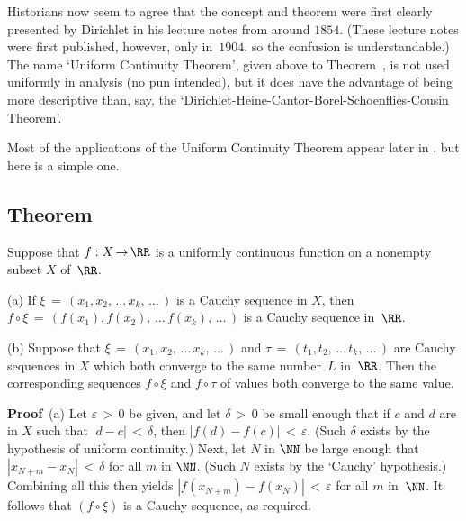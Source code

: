         Historians now seem to agree that the concept and theorem were first clearly presented by Dirichlet in his lecture notes from around $1854$.
    (These lecture notes were first published, however, only in~$1904$, so the confusion is understandable.)
    The name `Uniform Continuity Theorem', given above to Theorem~, is not used uniformly in analysis (no pun intended),
    but it does have the advantage of being more descriptive than, say, the `Dirichlet-Heine-Cantor-Borel-Schoenflies-Cousin Theorem'.

\VV

        Most of the applications of the Uniform Continuity Theorem appear later in {\ThisText}, but here is a simple one.



            \subsection{\small{\bf Theorem}}
            \label{ThmD25.80}

\V

        Suppose that $f:X \,{\rightarrow}\, {\RR}$ is a uniformly continuous function on a nonempty subset $X$ of~${\RR}$.

\V


        (a) If ${\xi} \,=\, (x_{1}, x_{2},\,{\ldots}\,x_{k},\,{\ldots}\,)$ is a Cauchy sequence in $X$,
    then $f{\circ}{\xi} \,=\, (f(x_{1}), f(x_{2}),\,{\ldots}\,f(x_{k}),\,{\ldots}\,)$ is a Cauchy sequence in~${\RR}$.

\V

        (b) Suppose that ${\xi} \,=\, (x_{1}, x_{2},\,{\ldots}\,x_{k},\,{\ldots}\,)$
    and ${\tau} \,=\, (t_{1}, t_{2}, \,{\ldots}\,t_{k},\,{\ldots}\,)$ are Cauchy sequences in $X$ which both converge to the same number~$L$ in~${\RR}$.
    Then the corresponding sequences $f{\circ}{\xi}$ and $f{\circ}{\tau}$ of values both converge to the same value.

\V

        {\bf Proof}\, (a) Let ${\varepsilon}\,>\,0$ be given, and let ${\delta}\,>\,0$
    be small enough that if $c$ and $d$ are in $X$ such that $|d-c|\,<\,{\delta}$, then $|f(d)-f(c)|\,<\,{\varepsilon}$.
    (Such ${\delta}$ exists by the hypothesis of uniform continuity.) Next, let $N$ in ${\NN}$
    be large enough that $|x_{N+m} - x_{N}|\,<\,{\delta}$ for all $m$ in ${\NN}$. (Such $N$ exists by the `Cauchy' hypothesis.)
    Combining all this then yields $|f(x_{N+m})-f(x_{N})|\,<\,{\varepsilon}$ for all $m$ in~${\NN}$. It follows that $(f{\circ}{\xi})$ is a Cauchy sequence,
    as required.

